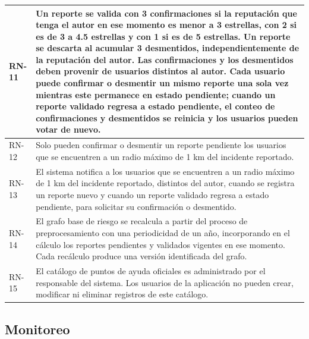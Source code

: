 \begin{longtable}{|K|Q|}
RN-11 & Un reporte se valida con 3 confirmaciones si la reputación que tenga el autor en ese momento es menor a 3 estrellas, con 2 si es de 3 a 4.5 estrellas y con 1 si es de 5 estrellas. Un reporte se descarta al acumular 3 desmentidos, independientemente de la reputación del autor. Las confirmaciones y los desmentidos deben provenir de usuarios distintos al autor. Cada usuario puede confirmar o desmentir un mismo reporte una sola vez mientras este permanece en estado pendiente; cuando un reporte validado regresa a estado pendiente, el conteo de confirmaciones y desmentidos se reinicia y los usuarios pueden votar de nuevo. \\ \hline
RN-12 & Solo pueden confirmar o desmentir un reporte pendiente los usuarios que se encuentren a un radio máximo de 1 km del incidente reportado. \\ \hline
RN-13 & El sistema notifica a los usuarios que se encuentren a un radio máximo de 1 km del incidente reportado, distintos del autor, cuando se registra un reporte nuevo y cuando un reporte validado regresa a estado pendiente, para solicitar su confirmación o desmentido. \\ \hline
RN-14 & El grafo base de riesgo se recalcula a partir del proceso de preprocesamiento con una periodicidad de un año, incorporando en el cálculo los reportes pendientes y validados vigentes en ese momento. Cada recálculo produce una versión identificada del grafo. \\ \hline
RN-15 & El catálogo de puntos de ayuda oficiales es administrado por el responsable del sistema. Los usuarios de la aplicación no pueden crear, modificar ni eliminar registros de este catálogo. \\ \hline
\end{longtable}

\subsection*{Monitoreo}

